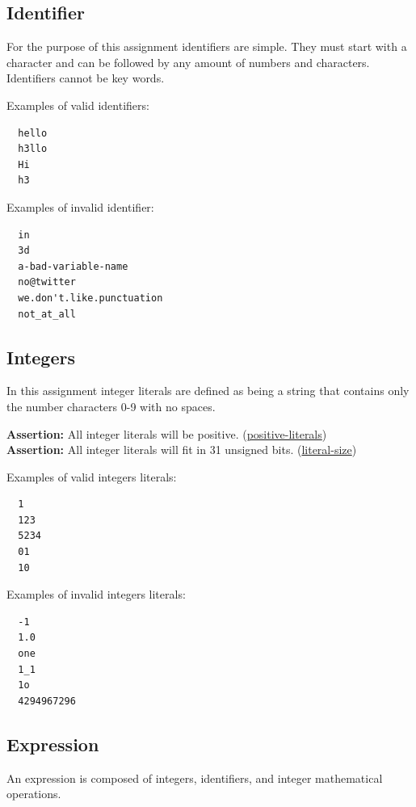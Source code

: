 \documentclass{article}
\newcommand{\assertion}[2]{\textbf{Assertion: }#1 (\hyperlink{#2}{#2})}
\begin{document}
\subsection{Identifier}
For the purpose of this assignment identifiers are simple. They must start with a character and
can be followed by any amount of numbers and characters. Identifiers cannot be key words.

Examples of valid identifiers:
\begin{lstlisting}
  hello
  h3llo
  Hi
  h3
\end{lstlisting}

Examples of invalid identifier:
\begin{lstlisting}
  in
  3d
  a-bad-variable-name
  no@twitter
  we.don't.like.punctuation
  not_at_all
\end{lstlisting}

\subsection{Integers}
In this assignment integer literals are defined as being a string that contains only the number
characters 0-9 with no spaces.

\assertion{All integer literals will be positive.}{positive-literals}\\
\assertion{All integer literals will fit in 31 unsigned bits.}{literal-size}

Examples of valid integers literals:
\begin{lstlisting}
  1
  123
  5234
  01
  10
\end{lstlisting}

Examples of invalid integers literals:
\begin{lstlisting}
  -1
  1.0
  one
  1_1
  1o
  4294967296
\end{lstlisting}

\subsection{Expression}
An expression is composed of integers, identifiers, and integer mathematical operations.
\end{document}
